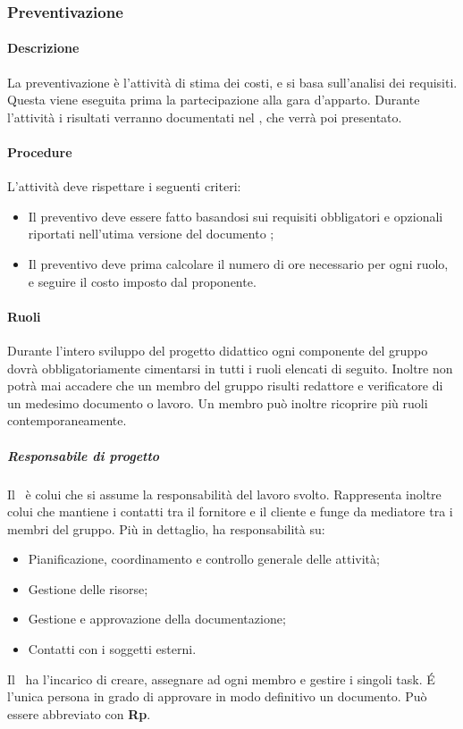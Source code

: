 \documentclass[../NormeDiProgetto_v4.0.0.tex]{subfiles}
\begin{document}
		\subsubsection{Preventivazione}
			\paragraph{Descrizione}
				La preventivazione è l'attività di stima dei costi, e si basa sull'analisi dei requisiti. Questa viene eseguita prima la partecipazione alla gara d'apparto.
				Durante l'attività i risultati verranno documentati nel \pianodiprogetto, che verrà poi presentato.
		
			\paragraph{Procedure}
				L'attività deve rispettare i seguenti criteri:
				\begin{itemize}
					\item Il preventivo deve essere fatto basandosi sui requisiti obbligatori e opzionali riportati nell'utima versione del documento \analisideirequisiti;
					\item Il preventivo deve prima calcolare il numero di ore necessario per ogni ruolo, e seguire il costo imposto dal proponente.
				\end{itemize}

			\paragraph{Ruoli}
			Durante l'intero sviluppo del progetto didattico ogni componente del gruppo dovrà obbligatoriamente cimentarsi in tutti i ruoli elencati di seguito.
			Inoltre non potrà mai accadere che un membro del gruppo risulti redattore e verificatore di un medesimo documento o lavoro.
			Un membro può inoltre ricoprire più ruoli contemporaneamente.
			
			\subparagraph{Responsabile di progetto}
			Il \responsabilediprogetto\ è colui che si assume la responsabilità del
			lavoro svolto. Rappresenta inoltre colui che mantiene i contatti tra il fornitore e il cliente e funge da mediatore tra i membri del gruppo. Più in dettaglio, ha responsabilità su:
			\begin{itemize}
			\item Pianificazione, coordinamento e controllo generale delle attività;
			\item Gestione delle risorse;
			\item Gestione e approvazione della documentazione;
			\item Contatti con i soggetti esterni.
			\end{itemize}
			Il \responsabilediprogetto\ ha l'incarico di creare, assegnare ad ogni membro e gestire i singoli task. É l'unica persona in grado di approvare in modo definitivo un documento.
			Può essere abbreviato con \textbf{Rp}.
			
\end{document}
